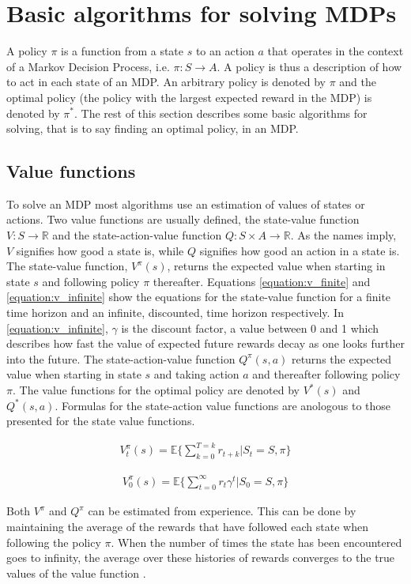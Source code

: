 \section{Basic algorithms for solving MDPs}

A policy $\pi$ is a function from a state $s$ to an action $a$ that operates in
the context of a Markov Decision Process, i.e. $\pi \colon S \to A$. A policy
is thus a description of how to act in each state of an MDP. An arbitrary
policy is denoted by $\pi$ and the optimal policy (the policy with the largest
expected reward in the MDP) is denoted by $\pi^*$. The rest of this section
describes some basic algorithms for solving, that is to say finding an optimal
policy, in an MDP.

\subsection{Value functions}

To solve an MDP most algorithms use an estimation of values of states or
actions. Two value functions are usually defined, the state-value function $V :
S \to \mathbb R$ and the state-action-value function $Q : S \times A \to
\mathbb R$. As the names imply, $V$ signifies how good a state is, while $Q$
signifies how good an action in a state is. The state-value function,
$V^\pi(s)$, returns the expected value when starting in state $s$ and following
policy $\pi$ thereafter. Equations \eqref{equation:v_finite} and \eqref{equation:v_infinite} show the equations for the state-value function for a finite time horizon and an infinite, discounted, time horizon respectively. In \eqref{equation:v_infinite}, $\gamma$ is the discount factor, a value between 0 and 1 which describes how fast the value of expected future rewards decay as one looks further into the future. The state-action-value function $Q^\pi(s, a)$ returns
the expected value when starting in state $s$ and taking action $a$ and
thereafter following policy $\pi$. The value functions for the optimal policy
are denoted by $V^*(s)$ and $Q^*(s, a)$. Formulas for the state-action value functions are anologous to those presented for the state value functions. 

\begin{align}
\label{equation:v_finite}
V_t^\pi(s) = \mathbb{E} \{ \sum_{k=0}^{T=k} r_{t+k} | S_t = S, \pi \}
\end{align}

\begin{align}
\label{equation:v_infinite}
V_{0}^\pi(s) = \mathbb{E} \{ \sum_{t=0}^\infty r_{t}\gamma^t | S_0 = S,\pi \}
\end{align}

Both $V^\pi$ and $Q^\pi$ can be estimated from experience. This can be done by
maintaining the average of the rewards that have followed each state when
following the policy $\pi$. When the number of times the state has been
encountered goes to infinity, the average over these histories of rewards
converges to the true values of the value function
\parencite{barto1998reinforcement}.




